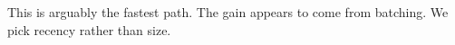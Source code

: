 \documentclass{article}
\begin{document}
This is arguably the fastest path.
The gain appears to come from batching.
We pick recency rather than size.
\end{document}
